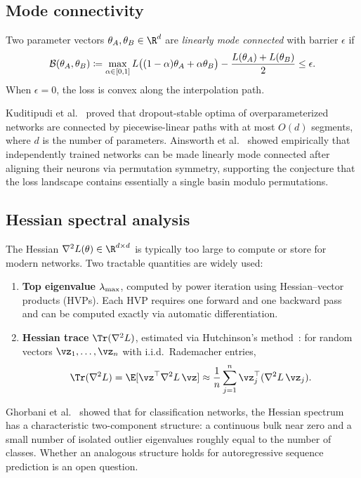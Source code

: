 \subsection{Mode connectivity}\label{subsec:mode-conn}

\begin{definition}\label{def:lmc}
  Two parameter vectors $\theta_A, \theta_B \in \R^d$ are \emph{linearly mode
  connected} with barrier $\epsilon$ if
  \[
    \mathcal{B}(\theta_A, \theta_B) \coloneqq
    \max_{\alpha \in [0,1]} L\bigl((1-\alpha)\theta_A + \alpha\theta_B\bigr)
    - \frac{L(\theta_A) + L(\theta_B)}{2} \le \epsilon.
  \]
  When $\epsilon = 0$, the loss is convex along the interpolation path.
\end{definition}

Kuditipudi et al.~\cite{kuditipudi2019explaining} proved that dropout-stable
optima of overparameterized networks are connected by piecewise-linear paths
with at most $O(d)$ segments, where $d$ is the number of parameters. Ainsworth
et al.~\cite{ainsworth2023git} showed empirically that independently trained
networks can be made linearly mode connected after aligning their neurons via
permutation symmetry, supporting the conjecture that the loss landscape
contains essentially a single basin modulo permutations.

\subsection{Hessian spectral analysis}\label{subsec:hessian}

The Hessian $\Hess L(\theta) \in \R^{d \times d}$ is typically too large to
compute or store for modern networks. Two tractable quantities are widely used:

\begin{enumerate}[leftmargin=*,itemsep=2pt]
\item \textbf{Top eigenvalue} $\lambda_{\max}$, computed by power iteration using
  Hessian--vector products (HVPs). Each HVP requires one forward and one
  backward pass and can be computed exactly via automatic
  differentiation.

\item \textbf{Hessian trace} $\Tr(\Hess L)$, estimated via Hutchinson's
  method~\cite{ghorbani2019investigation}: for random vectors
  $\vz_1, \ldots, \vz_n$ with i.i.d.\ Rademacher entries,
  \[
    \Tr(\Hess L) = \E[\vz^\top \Hess L \, \vz]
    \approx \frac{1}{n}\sum_{j=1}^n \vz_j^\top (\Hess L \, \vz_j).
  \]
\end{enumerate}

Ghorbani et al.~\cite{ghorbani2019investigation} showed that for classification
networks, the Hessian spectrum has a characteristic two-component structure: a
continuous bulk near zero and a small number of isolated outlier eigenvalues
roughly equal to the number of classes. Whether an analogous structure holds for
autoregressive sequence prediction is an open question.
